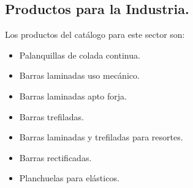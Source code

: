 \documentclass[12pt,a4paper]{article}
\begin{document}
\subsection{Productos para la Industria.}
Los productos del catálogo para este sector son:
\begin{itemize}
    \item Palanquillas de colada continua.
    \item Barras laminadas uso mecánico.
    \item Barras laminadas apto forja.
    \item Barras trefiladas.
    \item Barras laminadas y trefiladas para resortes.
    \item Barras rectificadas.
    \item Planchuelas para elásticos.
\end{itemize}
\end{document}

